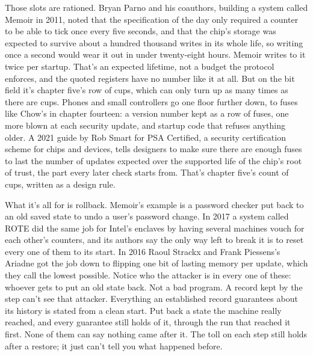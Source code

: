 \documentclass[11pt,twoside]{article}
\theoremstyle{thielethm}
\theoremstyle{thieledef}
\theoremstyle{thieledef}
\theoremstyle{thieledef}
\theoremstyle{thielethm}
\theoremstyle{thieleobs}
\theoremstyle{thielethm}
\begin{document}
Those slots are rationed. Bryan Parno and his coauthors, building a system called Memoir in 2011, noted that the specification of the day only required a counter to be able to tick once every five seconds, and that the chip's storage was expected to survive about a hundred thousand writes in its whole life, so writing once a second would wear it out in under twenty-eight hours. Memoir writes to it twice per startup. That's an expected lifetime, not a budget the protocol enforces, and the quoted registers have no number like it at all. But on the bit field it's chapter five's row of cups, which can only turn up as many times as there are cups. Phones and small controllers go one floor further down, to fuses like Chow's in chapter fourteen: a version number kept as a row of fuses, one more blown at each security update, and startup code that refuses anything older. A 2021 guide by Rob Smart for PSA Certified, a security certification scheme for chips and devices, tells designers to make sure there are enough fuses to last the number of updates expected over the supported life of the chip's root of trust, the part every later check starts from. That's chapter five's count of cups, written as a design rule.

What it's all for is rollback. Memoir's example is a password checker put back to an old saved state to undo a user's password change. In 2017 a system called ROTE did the same job for Intel's enclaves by having several machines vouch for each other's counters, and its authors say the only way left to break it is to reset every one of them to its start. In 2016 Raoul Strackx and Frank Piessens's Ariadne got the job down to flipping one bit of lasting memory per update, which they call the lowest possible. Notice who the attacker is in every one of these: whoever gets to put an old state back. Not a bad program. A record kept by the step can't see that attacker. Everything an established record guarantees about its history is stated from a clean start. Put back a state the machine really reached, and every guarantee still holds of it, through the run that reached it first. None of them can say nothing came after it. The toll on each step still holds after a restore; it just can't tell you what happened before.
\end{document}
